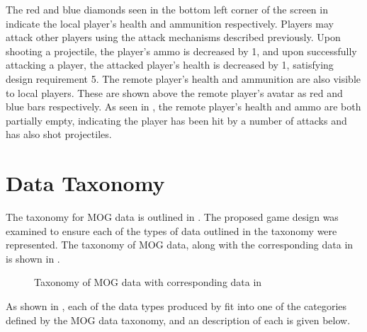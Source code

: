 The red and blue diamonds seen in the bottom left corner of the screen in  indicate the local player's health and ammunition respectively. Players may attack other players using the attack mechanisms described previously. Upon shooting a projectile, the player's ammo is decreased by 1, and upon successfully attacking a player, the attacked player's health is decreased by 1, satisfying design requirement 5. The remote player's health and ammunition are also visible to local players. These are shown above the remote player's avatar as red and blue bars respectively. As seen in , the remote player's health and ammo are both partially empty, indicating the player has been hit by a number of attacks and has also shot projectiles. 

\section{\game{} Data Taxonomy}
The taxonomy for MOG data is outlined in . The proposed game design was examined to ensure each of the types of data outlined in the taxonomy were represented. The taxonomy of MOG data, along with the corresponding data in \game{} is shown in .

\begin{figure}[H]
    \centering
    \caption{Taxonomy of MOG data with corresponding data in \game{}}
    \label{fig:des:taxonomy-with-data}
\end{figure}

As shown in , each of the data types produced by \game{} fit into one of the categories defined by the MOG data taxonomy, and an description of each is given below.

